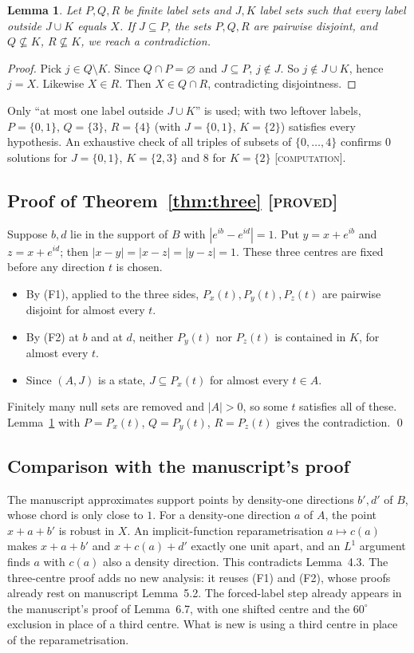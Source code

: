 \documentclass[11pt]{article}
\newtheorem{lemma}[theorem]{Lemma}
\theoremstyle{definition}
\theoremstyle{remark}
\newcommand{\st}[1]{\textsc{[#1]}}
\begin{document}
\begin{lemma}\label{lem:count}
Let $P,Q,R$ be finite label sets and $J,K$ label sets such that every label outside $J\cup K$ equals $X$. If $J\subseteq P$, the sets $P,Q,R$ are pairwise disjoint, and $Q\not\subseteq K$, $R\not\subseteq K$, we reach a contradiction.
\end{lemma}
\begin{proof}
Pick $j\in Q\setminus K$. Since $Q\cap P=\varnothing$ and $J\subseteq P$, $j\notin J$. So $j\notin J\cup K$, hence $j=X$. Likewise $X\in R$. Then $X\in Q\cap R$, contradicting disjointness.
\end{proof}
Only ``at most one label outside $J\cup K$'' is used; with two leftover labels, $P=\{0,1\}$, $Q=\{3\}$, $R=\{4\}$ (with $J=\{0,1\}$, $K=\{2\}$) satisfies every hypothesis. An exhaustive check of all triples of subsets of $\{0,\dots,4\}$ confirms 0 solutions for $J=\{0,1\}$, $K=\{2,3\}$ and 8 for $K=\{2\}$ \st{computation}.

\subsection{Proof of Theorem~\ref{thm:three} \st{proved}}
Suppose $b,d$ lie in the support of $B$ with $|e^{ib}-e^{id}|=1$. Put $y=x+e^{ib}$ and $z=x+e^{id}$; then $|x-y|=|x-z|=|y-z|=1$. These three centres are fixed before any direction $t$ is chosen.
\begin{itemize}
\item By (F1), applied to the three sides, $P_x(t),P_y(t),P_z(t)$ are pairwise disjoint for almost every $t$.
\item By (F2) at $b$ and at $d$, neither $P_y(t)$ nor $P_z(t)$ is contained in $K$, for almost every $t$.
\item Since $(A,J)$ is a state, $J\subseteq P_x(t)$ for almost every $t\in A$.
\end{itemize}
Finitely many null sets are removed and $|A|>0$, so some $t$ satisfies all of these. Lemma~\ref{lem:count} with $P=P_x(t)$, $Q=P_y(t)$, $R=P_z(t)$ gives the contradiction. \qed

\subsection{Comparison with the manuscript's proof}
The manuscript approximates support points by density-one directions $b',d'$ of $B$, whose chord is only close to $1$. For a density-one direction $a$ of $A$, the point $x+a+b'$ is robust in $X$. An implicit-function reparametrisation $a\mapsto c(a)$ makes $x+a+b'$ and $x+c(a)+d'$ exactly one unit apart, and an $L^1$ argument finds $a$ with $c(a)$ also a density direction. This contradicts Lemma~4.3. The three-centre proof adds no new analysis: it reuses (F1) and (F2), whose proofs already rest on manuscript Lemma~5.2. The forced-label step already appears in the manuscript's proof of Lemma~6.7, with one shifted centre and the $60^\circ$ exclusion in place of a third centre. What is new is using a third centre in place of the reparametrisation.
\end{document}
